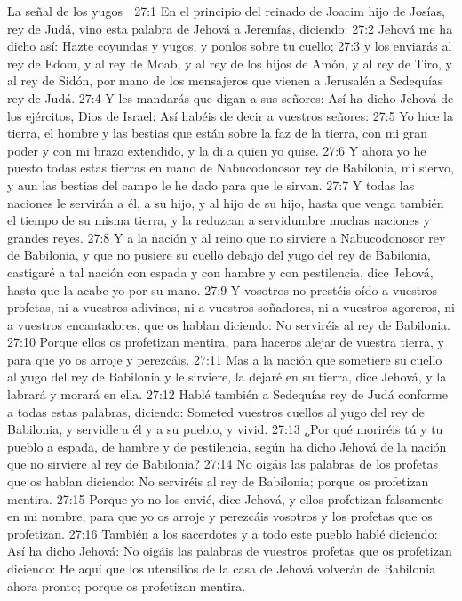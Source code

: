 La señal de los yugos  

27:1 En el principio del reinado de Joacim hijo de Josías, rey de Judá, vino esta palabra de Jehová a Jeremías, diciendo:  
27:2 Jehová me ha dicho así: Hazte coyundas y yugos, y ponlos sobre tu cuello;  
27:3 y los enviarás al rey de Edom, y al rey de Moab, y al rey de los hijos de Amón, y al rey de Tiro, y al rey de Sidón, por mano de los mensajeros que vienen a Jerusalén a Sedequías rey de Judá.  
27:4 Y les mandarás que digan a sus señores: Así ha dicho Jehová de los ejércitos, Dios de Israel: Así habéis de decir a vuestros señores:  
27:5 Yo hice la tierra, el hombre y las bestias que están sobre la faz de la tierra, con mi gran poder y con mi brazo extendido, y la di a quien yo quise.  
27:6 Y ahora yo he puesto todas estas tierras en mano de Nabucodonosor rey de Babilonia, mi siervo, y aun las bestias del campo le he dado para que le sirvan.  
27:7 Y todas las naciones le servirán a él, a su hijo, y al hijo de su hijo, hasta que venga también el tiempo de su misma tierra, y la reduzcan a servidumbre muchas naciones y grandes reyes.  
27:8 Y a la nación y al reino que no sirviere a Nabucodonosor rey de Babilonia, y que no pusiere su cuello debajo del yugo del rey de Babilonia, castigaré a tal nación con espada y con hambre y con pestilencia, dice Jehová, hasta que la acabe yo por su mano.  
27:9 Y vosotros no prestéis oído a vuestros profetas, ni a vuestros adivinos, ni a vuestros soñadores, ni a vuestros agoreros, ni a vuestros encantadores, que os hablan diciendo: No serviréis al rey de Babilonia.  
27:10 Porque ellos os profetizan mentira, para haceros alejar de vuestra tierra, y para que yo os arroje y perezcáis.  
27:11 Mas a la nación que sometiere su cuello al yugo del rey de Babilonia y le sirviere, la dejaré en su tierra, dice Jehová, y la labrará y morará en ella.  
27:12 Hablé también a Sedequías rey de Judá conforme a todas estas palabras, diciendo: Someted vuestros cuellos al yugo del rey de Babilonia, y servidle a él y a su pueblo, y vivid.  
27:13 ¿Por qué moriréis tú y tu pueblo a espada, de hambre y de pestilencia, según ha dicho Jehová de la nación que no sirviere al rey de Babilonia?  
27:14 No oigáis las palabras de los profetas que os hablan diciendo: No serviréis al rey de Babilonia; porque os profetizan mentira.  
27:15 Porque yo no los envié, dice Jehová, y ellos profetizan falsamente en mi nombre, para que yo os arroje y perezcáis vosotros y los profetas que os profetizan.  
27:16 También a los sacerdotes y a todo este pueblo hablé diciendo: Así ha dicho Jehová: No oigáis las palabras de vuestros profetas que os profetizan diciendo: He aquí que los utensilios de la casa de Jehová volverán de Babilonia ahora pronto; porque os profetizan mentira.  
